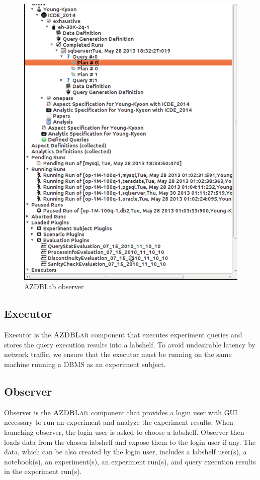 \documentclass[conference]{IEEEtran}
\def\azdb{\hbox{\sc AZDBLab}}
\begin{document}
\begin{figure}[htp!]
\centering
\includegraphics[scale=0.33]{./figures/observer_gui}
\caption{{\sc AZDBLab} observer\label{fig:observer_gui}}
\end{figure}

\subsection{Executor}
Executor is the $\azdb$ component that executes experiment queries 
and stores the query execution results into a labshelf. 
To avoid undesirable latency by network traffic, we ensure that the executor must be running 
on the same machine running a DBMS as an experiment subject. 

\subsection{Observer}
Observer is the $\azdb$ component that provides a login user 
with GUI necessary to run an experiment and analyze the experiment results. 
When launching observer, the login user is asked to choose a labshelf. 
Observer then loads data from the chosen labshelf and expose them to 
the login user if any. The data, which can be also created by the login user, 
includes a labshelf user(s), a notebook(s), an experiment(s), 
an experiment run(s), and query execution results in the experiment run(s). 
\end{document}
